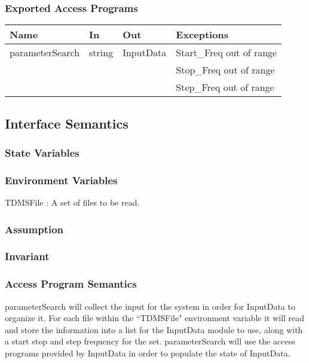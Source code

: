 \documentclass[12pt]{article}
\begin{document}
\subsubsection{Exported Access Programs}
\begin{center}
\begin{tabular}{l l l l}
\hline
\textbf{Name} & \textbf{In} & \textbf{Out} & \textbf{Exceptions} \\ \hline
parameterSearch & string & InputData 
& Start\_Freq out of range\\
& & & Stop\_Freq out of range\\
& & & Step\_Freq out of range\\
\hline
\end{tabular}
\end{center}

\subsection{Interface Semantics}
\subsubsection{State Variables}
\subsubsection{Environment Variables}
TDMSFile : A set of files to be read.

\subsubsection{Assumption}
\subsubsection{Invariant}
\subsubsection{Access Program Semantics}
parameterSearch will collect the input for the system in order for InputData 
to organize it. For each file within the ``TDMSFile" environment variable it 
will read and store the information into a list for the InputData module to use,
along with a start stop and step frequency for the set. parameterSearch will
 use the access programs provided by InputData in order to populate the state of 
InputData.
\end{document}
